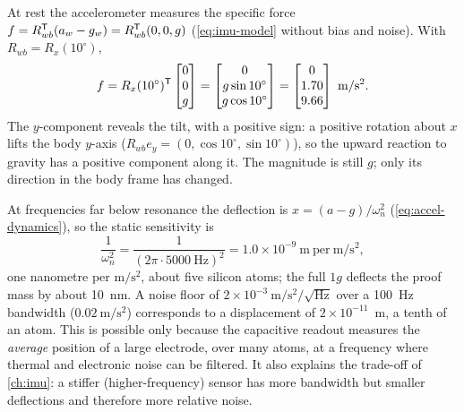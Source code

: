 \begin{solutions}
  \item At rest the accelerometer measures the specific force $f = R_{wb}^{\mathsf{T}}(a_w - g_w) = R_{wb}^{\mathsf{T}}(0, 0, g)$ (\eqref{eq:imu-model} without bias and noise). With
        $R_{wb} = R_x(10^\circ)$,
        \[
          f = R_x(10^\circ)^{\mathsf{T}}\begin{bmatrix}0\\0\\g\end{bmatrix} = \begin{bmatrix}0\\ g\sin10^\circ\\ g\cos10^\circ\end{bmatrix} = \begin{bmatrix}0\\ 1.70\\ 9.66\end{bmatrix}~\mathrm{m/s^2}.
        \]
        The $y$-component reveals the tilt, with a positive sign: a positive rotation about $x$ lifts the body $y$-axis ($R_{wb}e_y = (0, \cos10^\circ, \sin10^\circ)$), so the
        upward reaction to gravity has a positive component along it. The magnitude is still $g$; only its direction in the body frame has changed.

  \item At frequencies far below resonance the deflection is $x = (a - g)/\omega_n^2$ (\cref{eq:accel-dynamics}), so the static sensitivity is
        \[
          \frac{1}{\omega_n^2} = \frac{1}{(2\pi\cdot5000~\mathrm{Hz})^2} = 1.0\times10^{-9}~\mathrm{m\ per\ m/s^2},
        \]
        one nanometre per $\mathrm{m/s^2}$, about five silicon atoms; the full $1g$ deflects the proof mass by about 10~nm. A noise floor of
        $2\times10^{-3}~\mathrm{m/s^2/\sqrt{Hz}}$ over a 100~Hz bandwidth ($0.02~\mathrm{m/s^2}$) corresponds to a displacement of $2\times10^{-11}$~m, a tenth of an atom.
        This is possible only because the capacitive readout measures the \emph{average} position of a large electrode, over many atoms, at a
        frequency where thermal and electronic noise can be filtered. It also explains the trade-off of \cref{ch:imu}: a stiffer (higher-frequency)
        sensor has more bandwidth but smaller deflections and therefore more relative noise.


\end{solutions}
